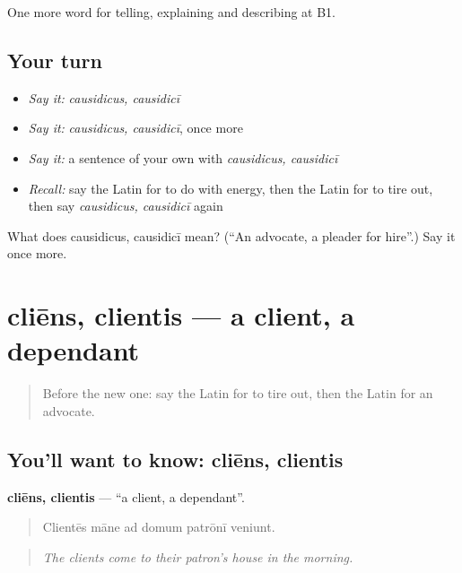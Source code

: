 \begin{grammarlens}[title={What you've built}]
One more word for telling, explaining and describing at B1.
\end{grammarlens}

\subsection*{Your turn}
\begin{itemize}
\raggedright
  \item \emph{Say it:} \emph{causidicus, causidicī}
  \item \emph{Say it:} \emph{causidicus, causidicī}, once more
  \item \emph{Say it:} a sentence of your own with \emph{causidicus, causidicī}
  \item \emph{Recall:} say the Latin for to do with energy, then the Latin for to tire out, then say \emph{causidicus, causidicī} again
\end{itemize}

\begin{tcolorbox}[breakable,colback=teal!4,colframe=teal!35!black,title={Before you move on}]
What does causidicus, causidicī mean? (\textquotedblleft{}An advocate, a pleader for hire\textquotedblright{}.) Say it once more.
\end{tcolorbox}
\section[cliēns, clientis]{cliēns, clientis — a client, a dependant}

\label{lesson:LA-C381-cliens}



\begin{quote}
Before the new one: say the Latin for to tire out, then the Latin for an advocate.
\end{quote}

\subsection*{You'll want to know: cliēns, clientis}
\textbf{cliēns, clientis} — \textquotedblleft{}a client, a dependant\textquotedblright{}.

\begin{quote}
Clientēs māne ad domum patrōnī veniunt.
\end{quote}

\begin{quote}
\emph{The clients come to their patron's house in the morning.}
\end{quote}

